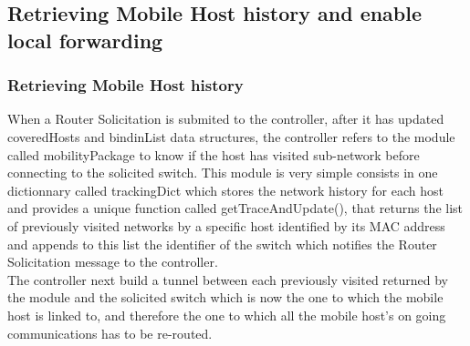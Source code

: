 \documentclass{article}
\begin{document}
\subsection{Retrieving Mobile Host history and enable local forwarding}

\subsubsection{Retrieving Mobile Host history}
When a Router Solicitation is submited to the controller, after it has
updated coveredHosts and bindinList data structures, the controller
refers to the module called mobilityPackage to know if the host has
visited sub-network before connecting to the solicited switch. This
module is very simple consists in one dictionnary called trackingDict
which stores the network history for each host and provides a unique
function called getTraceAndUpdate(), that returns the list of
previously visited networks by a specific host identified by its MAC
address and appends to this list the identifier of the switch which
notifies the Router Solicitation message to the controller.\\
\newline
The controller next build a tunnel between each previously visited
returned by the module and the solicited switch which is now the one
to which the mobile host is linked to, and therefore the one to which
all the mobile host's on going communications has to be re-routed.
\end{document}
